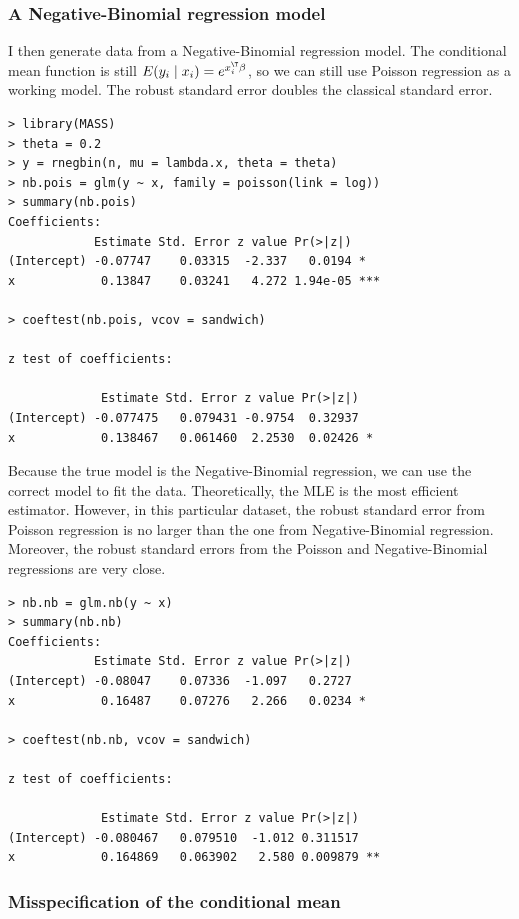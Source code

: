 \subsubsection{A Negative-Binomial regression model}


I then generate data from a Negative-Binomial regression model. The conditional mean function is still $E(y_i\mid x_i) = e^{x_i^{\T} \beta}$, so we can still use Poisson regression as a working model. The robust standard error doubles the classical standard error. 

\begin{lstlisting}
> library(MASS)
> theta = 0.2
> y = rnegbin(n, mu = lambda.x, theta = theta)
> nb.pois = glm(y ~ x, family = poisson(link = log))
> summary(nb.pois)
Coefficients:
            Estimate Std. Error z value Pr(>|z|)    
(Intercept) -0.07747    0.03315  -2.337   0.0194 *  
x            0.13847    0.03241   4.272 1.94e-05 ***

> coeftest(nb.pois, vcov = sandwich)

z test of coefficients:

             Estimate Std. Error z value Pr(>|z|)  
(Intercept) -0.077475   0.079431 -0.9754  0.32937  
x            0.138467   0.061460  2.2530  0.02426 *
\end{lstlisting}


Because the true model is the Negative-Binomial regression, we can use the correct model to fit the data. Theoretically, the MLE is the most efficient estimator. However, in this particular dataset, the robust standard error from Poisson regression is no larger than the one from Negative-Binomial regression. Moreover, the robust standard errors from the Poisson and Negative-Binomial regressions are very close. 

\begin{lstlisting}
> nb.nb = glm.nb(y ~ x)
> summary(nb.nb)
Coefficients:
            Estimate Std. Error z value Pr(>|z|)  
(Intercept) -0.08047    0.07336  -1.097   0.2727  
x            0.16487    0.07276   2.266   0.0234 *

> coeftest(nb.nb, vcov = sandwich)

z test of coefficients:

             Estimate Std. Error z value Pr(>|z|)   
(Intercept) -0.080467   0.079510  -1.012 0.311517   
x            0.164869   0.063902   2.580 0.009879 **
\end{lstlisting}


 

\subsubsection{Misspecification of the conditional mean}


